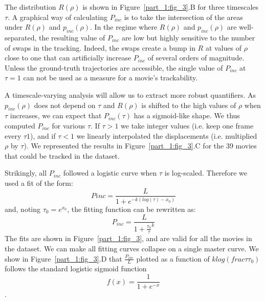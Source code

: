     The distribution $R(\rho)$ is shown in Figure~\ref{part_1:fig_3}.B for three timescales $\tau$. A graphical way of calculating $P_{inc}$ is to take the intersection of the areas under $R(\rho)$ and $p_{inc}(\rho)$. In the regime where $R(\rho)$ and $p_{inc}(\rho)$ are well-separated, the resulting value of $P_{inc}$ are low but highly sensitive to the number of swaps in the tracking. Indeed, the swaps create a bump in $R$  at values of $\rho$ close to one that can artificially increase $P_{inc}$ of several orders of magnitude. Unless the ground-truth trajectories are accessible, the single value of $P_{inc}$ at $\tau=1$ can not be used as a measure for a movie's trackability.

    A timescale-varying analysis will allow us to extract more robust quantifiers. As $p_{inc}(\rho)$ does not depend on $\tau$ and $R(\rho)$ is shifted to the high values of $\rho$ when $\tau$ increases, we can expect that $P_{inc}(\tau)$ has a sigmoid-like shape. We thus computed $P_{inc}$ for various $\tau$. If $\tau>1$ we take integer values (i.e. keep one frame every $\tau1$), and if $\tau<1$ we linearly interpolated the displacements (i.e. multiplied $\rho$ by $\tau$). We represented the results in Figure~\ref{part_1:fig_3}.C for the 39 movies that could be tracked in the dataset.

    Strikingly, all $P_{inc}$ followed a logistic curve when $\tau$ is log-scaled. Therefore we used a fit of the form:
    $$Pinc=\frac{L}{1 + e^{-k(log(\tau)-x_0)}}$$
    and, noting $\tau_0=e^{x_0}$, the fitting function can be rewritten as:
    $$P_{inc}=\frac{L}{1 + \frac{\tau_0}{\tau}^k}$$
    The fits are shown in Figure~\ref{part_1:fig_3}, and are valid for all the movies in the dataset. We can make all fitting curves collapse on a single master curve. We show in Figure~\ref{part_1:fig_3}.D that $\frac{P_{inc}}{L}$ plotted as a function of $klog(frac{\tau}{\tau_0})$ follows the standard logistic sigmoid function $$f(x) =\frac{1}{1+e^{-x}}$$.

